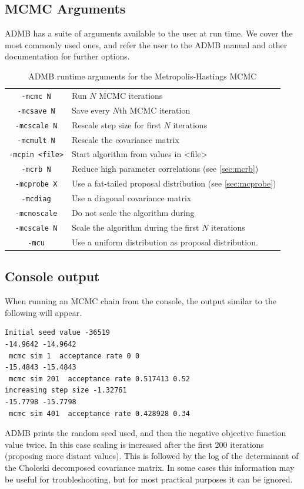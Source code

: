 \documentclass{article}\usepackage[]{graphicx}\usepackage[]{color}
\begin{document}
\subsection{MCMC Arguments}
ADMB has a suite of arguments available to the user at run
time. We cover the most commonly used ones, and refer the
user to the ADMB manual and other documentation for further
options.
\begin{table}[h]
  \centering
  \begin{tabular}[h]{|cl|}
    \hline
    \texttt{-mcmc N} & Run $N$ MCMC iterations\\
    \texttt{-mcsave N} & Save every $N$th MCMC iteration\\
    \texttt{-mcscale N} & Rescale step size for first $N$ iterations\\
    \texttt{-mcmult N} & Rescale the covariance matrix\\
    \texttt{-mcpin <file>} & Start algorithm from values in <file>\\
    \texttt{-mcrb N} & Reduce high parameter correlations
    (see \ref{sec:mcrb})\\
    \texttt{-mcprobe X} & Use a fat-tailed proposal
    distribution (see \ref{sec:mcprobe})\\
    \texttt{-mcdiag} & Use a diagonal covariance matrix\\
    \texttt{-mcnoscale} & Do not scale the algorithm during\\
    \texttt{-mcscale N} & Scale the algorithm during the
        first $N$ iterations\\
    \texttt{-mcu} & Use a uniform distribution as proposal distribution.\\
    \hline
  \end{tabular}
  \caption{ADMB runtime arguments for the Metropolis-Hastings MCMC}
  \label{tab:mh_args}
\end{table}
\subsection{Console output}
When running an MCMC chain from the console, the output
similar to the following will appear.
\begin{verbatim}
Initial seed value -36519
-14.9642 -14.9642
 mcmc sim 1  acceptance rate 0 0
-15.4843 -15.4843
 mcmc sim 201  acceptance rate 0.517413 0.52
increasing step size -1.32761
-15.7798 -15.7798
 mcmc sim 401  acceptance rate 0.428928 0.34
\end{verbatim}
ADMB prints the random seed used, and then the negative
objective function value twice. In this case scaling is
increased after the first 200 iterations (proposing more
distant values). This is followed by the log of the
determinant of the Choleski decomposed covariance matrix. In
some cases this information may be useful for
troubleshooting, but for most practical purposes it can be
ignored.
\end{document}
